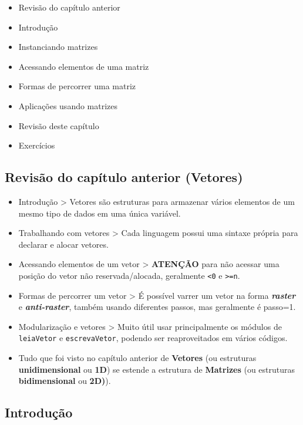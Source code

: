 \documentclass[12pt,a4paper]{article}
\providecommand{\tightlist}{%
      \setlength{\itemsep}{0pt}\setlength{\parskip}{0pt}}
\begin{document}
\begin{itemize}
\tightlist
\item
  Revisão do capítulo anterior
\item
  Introdução
\item
  Instanciando matrizes
\item
  Acessando elementos de uma matriz
\item
  Formas de percorrer uma matriz
\item
  Aplicações usando matrizes
\item
  Revisão deste capítulo
\item
  Exercícios
\end{itemize}

    \hypertarget{revisuxe3o-do-capuxedtulo-anterior-vetores}{%
\subsection{Revisão do capítulo anterior
(Vetores)}\label{revisuxe3o-do-capuxedtulo-anterior-vetores}}

    \begin{itemize}
\item
  Introdução \textgreater{} Vetores são estruturas para armazenar vários
  elementos de um mesmo tipo de dados em uma única variável.
\item
  Trabalhando com vetores \textgreater{} Cada linguagem possui uma
  sintaxe própria para declarar e alocar vetores.
\item
  Acessando elementos de um vetor \textgreater{} \textbf{ATENÇÃO} para
  não acessar uma posição do vetor não reservada/alocada, geralmente
  \texttt{\textless{}0} e \texttt{\textgreater{}=n}.
\item
  Formas de percorrer um vetor \textgreater{} É possível varrer um vetor
  na forma \textbf{\emph{raster}} e \textbf{\emph{anti-raster}}, também
  usando diferentes passos, mas geralmente é passo=1.
\item
  Modularização e vetores \textgreater{} Muito útil usar principalmente
  os módulos de \texttt{leiaVetor} e \texttt{escrevaVetor}, podendo ser
  reaproveitados em vários códigos.
\item
  Tudo que foi visto no capítulo anterior de \textbf{Vetores} (ou
  estruturas \textbf{unidimensional} ou \textbf{1D}) se estende a
  estrutura de \textbf{Matrizes} (ou estruturas \textbf{bidimensional}
  ou \textbf{2D)}).
\end{itemize}

    \hypertarget{introduuxe7uxe3o}{%
\subsection{Introdução}\label{introduuxe7uxe3o}}
\end{document}
